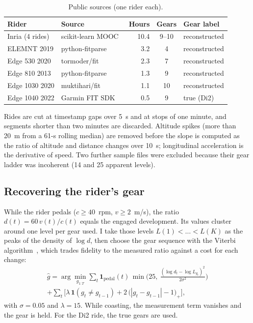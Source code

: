 \documentclass[conference]{IEEEtran}
\begin{document}
\begin{table}[t]
\centering
\caption{Public sources (one rider each).}
\label{tab:sources}
\setlength{\tabcolsep}{3.5pt}
\begin{tabular}{@{}llrcl@{}}
\toprule
Rider & Source & Hours & Gears & Gear label \\
\midrule
Inria (4 rides) & scikit-learn MOOC~\cite{inria} & 10.4 & 9--10 & reconstructed \\
ELEMNT 2019 & python-fitparse~\cite{fitparse} & 3.2 & 4 & reconstructed \\
Edge 530 2020 & tormoder/fit~\cite{tormoder} & 2.3 & 7 & reconstructed \\
Edge 810 2013 & python-fitparse~\cite{fitparse} & 1.3 & 9 & reconstructed \\
Edge 1030 2020 & muktihari/fit~\cite{muktihari} & 1.1 & 10 & reconstructed \\
Edge 1040 2022 & Garmin FIT SDK~\cite{garminsdk} & 0.5 & 9 & true (Di2) \\
\bottomrule
\end{tabular}
\end{table}

Rides are cut at timestamp gaps over 5~s and at stops of one minute, and segments shorter than two minutes are discarded. Altitude spikes (more than 20~m from a 61-s rolling median) are removed before the slope is computed as the ratio of altitude and distance changes over 10~s; longitudinal acceleration is the derivative of speed. Two further sample files were excluded because their gear ladder was incoherent (14 and 25 apparent levels).

\subsection{Recovering the rider's gear}
While the rider pedals ($c \ge 40$~rpm, $v \ge 2$~m/s), the ratio $d(t) = 60\,v(t)/c(t)$ equals the engaged development. Its values cluster around one level per gear used. I take those levels $L(1) < \dots < L(K)$ as the peaks of the density of $\log d$, then choose the gear sequence with the Viterbi algorithm~\cite{viterbi}, which trades fidelity to the measured ratio against a cost for each change:
\begin{multline}
\hat g = \arg\min_{g_{1:T}} \sum_t \mathbf{1}_{\mathrm{pedal}}(t)\,\min\!\Big(25,\ \frac{(\log d_t - \log L_{g_t})^2}{2\sigma^2}\Big)\\
+ \sum_t \Big[\lambda\,\mathbf{1}(g_t \neq g_{t-1}) + 2\,\big(|g_t - g_{t-1}| - 1\big)_+\Big],
\end{multline}
with $\sigma = 0.05$ and $\lambda = 15$. While coasting, the measurement term vanishes and the gear is held. For the Di2 ride, the true gears are used.
\end{document}
